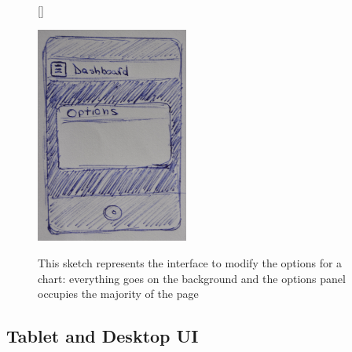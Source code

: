 \documentclass[a4paper,13pt]{report}
\begin{document}
\begin{figure}[H]
[\FBwidth]
{\caption{This sketch represents the interface to modify the options for a chart: everything goes on the background and the options panel occupies the majority of the page}\label{fig:test}}
{\includegraphics[width=5cm]{pics/UISketches/mobileSk3}}
\end{figure}




\subsection{ Tablet and Desktop UI  }
\end{document}
